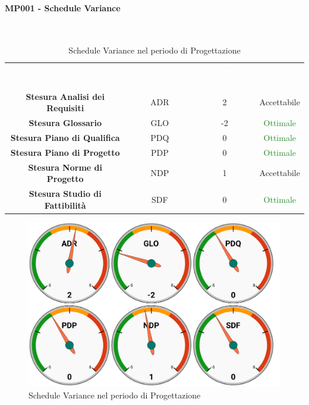 \paragraph{MP001 - Schedule Variance}\mbox{}\\[0,3cm]
\begin{table}[H]
    \centering
    \begin{tabular}{cccc}
        \rowcolor{greySWEight}
        \textcolor{white}{\textbf{Attività}} & 
        \textcolor{white}{\textbf{Abbreviazione}} &
        \textcolor{white}{\textbf{Valore Indice}}&
        \textcolor{white}{\textbf{Riscontro}}\\
		\textbf{Stesura Analisi dei Requisiti} & ADR & 2 & \textcolor{YellowOrange}{Accettabile}\\
		\textbf{Stesura Glossario} & GLO & -2 & \textcolor{ForestGreen}{Ottimale} \\
		\textbf{Stesura Piano di Qualifica} & PDQ & 0 & \textcolor{ForestGreen}{Ottimale} \\
		\textbf{Stesura Piano di Progetto} & PDP & 0 & \textcolor{ForestGreen}{Ottimale} \\
		\textbf{Stesura Norme di Progetto} & NDP & 1 & \textcolor{YellowOrange}{Accettabile} \\
		\textbf{Stesura Studio di Fattibilità} & SDF & 0 & \textcolor{ForestGreen}{Ottimale} \\

    \end{tabular}
    \caption{Schedule Variance nel periodo di Progettazione}
\end{table}
\begin{figure}[H]
    \centering
	\includegraphics[width=1\linewidth]{sez/App_Esito/Progettazione/graph/PR_SV.pdf}
	\caption{Schedule Variance nel periodo di Progettazione}
\end{figure}


